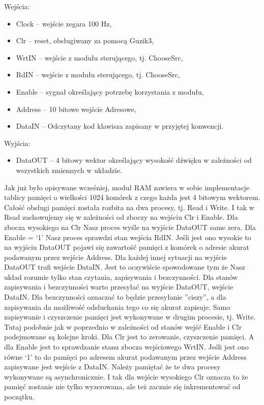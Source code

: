 \documentclass[11pt]{article}
\begin{document}
	Wejścia:
	\begin{itemize}[noitemsep]
	\item Clock – wejście zegara 100 Hz,
	\item Clr – reset, obsługiwany za pomocą Guzik3,
	\item WrtIN – wejście z modułu sterującego, tj. ChooseSrc,
	\item RdIN – wejście z modułu sterującego, tj. ChooseSrc,
	\item Enable – sygnał określający potrzebę korzystania z modułu,
	\item Address – 10 bitowe wejście Adresowe,
	\item DataIN – Odczytany kod klawisza zapisany w przyjętej konwencji.
	\end{itemize}
	Wyjścia:
	\begin{itemize}[noitemsep]
	\item DataOUT – 4 bitowy wektor określający wysokość dźwięku w zależności od wszystkich zmiennych w układzie.
	\end{itemize}
	
	Jak już było opisywane wcześniej, moduł RAM zawiera w sobie implementacje tablicy pamięci o wielkości 1024 komórek z czego każda jest 4 bitowym wektorem. Całość obsługi pamięci została rozbita na dwa procesy, tj. Read i Write. I tak w Read zachowujemy się w zależności od zboczy na wejściu Clr i Enable. Dla zbocza wysokiego na Clr Nasz proces wyśle na wyjście DataOUT same zera. Dla Enable = ‘1’ Nasz proces sprawdzi stan wejścia RdIN. Jeśli jest ono wysokie to na wyjściu DataOUT pojawi się zawartość pamięci z komórek o adresie akurat podawanym przez wejście Address. Dla każdej innej sytuacji na wyjście DataOUT trafi wejście DataIN. Jest to oczywiście spowodowane tym że Nasz układ rozumie tylko stan czytania, zapisywania i bezczynności. Dla stanów zapisywania i bezczynności warto przesyłać na wyjście DataOUT, wejście DataIN. Dla bezczynności oznaczać to będzie przesyłanie ”ciszy”, a dla zapisywania da możliwość odsłuchania tego co się akurat zapisuje. Samo zapisywanie i czyszczenie pamięci jest wykonywane w drugim procesie, tj. Write. Tutaj podobnie jak w poprzednio w zależności od stanów wejść Enable i Clr podejmowane są kolejne kroki. Dla Clr jest to zerowanie, czyszczenie pamięci. A dla Enable jest to sprawdzanie stanu zbocza wejściowego WrtIN. Jeśli jest ono równe ‘1’ to do pamięci po adresem akurat podawanym przez wejście Address zapisywane jest wejście z DataIN. Należy pamiętać że te dwa procesy wykonywane są asynchronicznie. I tak dla wejście wysokiego Clr oznacza to że pamięć zostanie nie tylko wyzerowana, ale też zacznie się inkrementować od początku.
	
\end{document}

